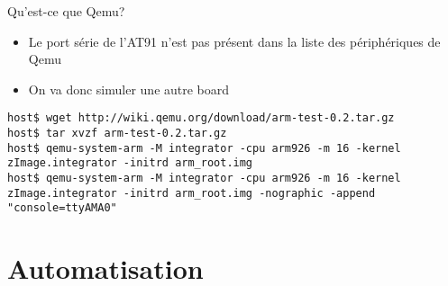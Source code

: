 \begin{frame}[fragile=singleslide]{Qu'est-ce que Qemu?}
  \begin{itemize}
  \item Le  port série de l'AT91  n'est pas présent dans  la liste des
    périphériques de Qemu
  \item On va donc simuler une autre board
  \end{itemize}
  \begin{lstlisting}[basicstyle=\ttfamily\scriptsize\color{colBasic}]
host$ wget http://wiki.qemu.org/download/arm-test-0.2.tar.gz
host$ tar xvzf arm-test-0.2.tar.gz
host$ qemu-system-arm -M integrator -cpu arm926 -m 16 -kernel zImage.integrator -initrd arm_root.img
host$ qemu-system-arm -M integrator -cpu arm926 -m 16 -kernel zImage.integrator -initrd arm_root.img -nographic -append "console=ttyAMA0"
  \end{lstlisting}
\end{frame}




\section{Automatisation}

